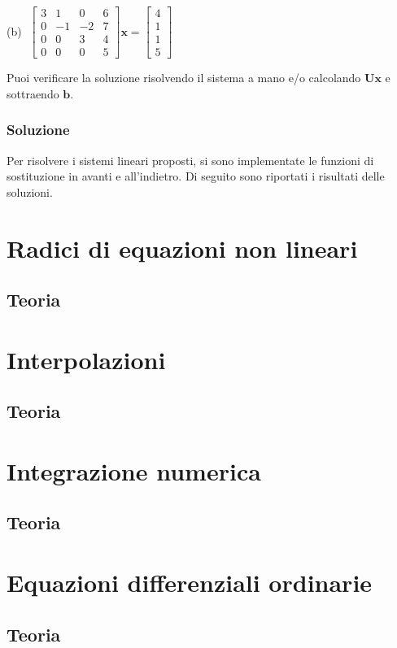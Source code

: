 \documentclass[letterpaper, 12pt]{article}
\begin{document}
    (b) $\;\begin{bmatrix}
      3 & 1 & 0 & 6 \\
      0 & -1 & -2 & 7 \\
      0 & 0 & 3 & 4 \\
      0 & 0 & 0 & 5
    \end{bmatrix} \mathbf{x} = \begin{bmatrix}
      4 \\ 1 \\ 1 \\ 5
    \end{bmatrix}$

Puoi verificare la soluzione risolvendo il sistema a mano e/o calcolando $\mathbf{U}\mathbf{x}$ e sottraendo $\mathbf{b}$.

\subsubsection{Soluzione}
Per risolvere i sistemi lineari proposti, si sono implementate le funzioni di sostituzione in avanti e all'indietro. 
Di seguito sono riportati i risultati delle soluzioni.


\section{Radici di equazioni non lineari}
\subsection{Teoria}

\section{Interpolazioni}
\subsection{Teoria}

\section{Integrazione numerica}
\subsection{Teoria}

\section{Equazioni differenziali ordinarie}
\subsection{Teoria}
\end{document}
